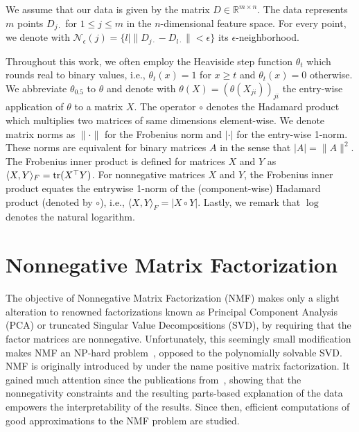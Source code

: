We assume that our data is given by the matrix $D\in\mathbb{R}^{m\times n}$. The data represents $m$ points $D_{j\cdot}$ for $1\leq j\leq m$ in the $n$-dimensional feature space. For every point, we denote with $\mathcal{N}_\epsilon(j)=\{l| \|D_{j\cdot}-D_{l\cdot}\|<\epsilon\}$ its $\epsilon$-neighborhood.

Throughout this work, we often employ the Heaviside step function $\theta_t$ which rounds real to binary values, i.e., $\theta_t(x)=1$ for $x\geq t$  and $\theta_t(x)=0$ otherwise. We abbreviate $\theta_{0.5}$ to $\theta$ and denote with $\theta(X)=(\theta(X_{ji}))_{ji}$ the entry-wise application of $\theta$ to a matrix $X$.
The operator $\circ$ denotes the Hadamard product which multiplies two matrices of same dimensions element-wise. 
We denote matrix norms as $\|\cdot\|$ for the Frobenius norm and $|\cdot|$ for the entry-wise 1-norm. These norms are equivalent for binary matrices $A$ in the sense that $|A|=\|A\|^2$. The Frobenius inner product is defined for matrices $X$ and $Y$ as $\langle X,Y\rangle_F=\operatorname*{tr}(X^\top Y)$. For nonnegative matrices $X$ and $Y$, the Frobenius inner product equates the entrywise 1-norm of the (component-wise) Hadamard product (denoted by $\circ$), i.e., $\langle X,Y\rangle_F=|X\circ Y|$. 
Lastly, we remark that $\log$ denotes the natural logarithm. 
\section{Nonnegative Matrix Factorization}
The objective of Nonnegative Matrix Factorization (NMF) makes only a slight alteration to renowned factorizations known as Principal Component Analysis (PCA) or truncated Singular Value Decompositions (SVD), by requiring that the factor matrices are nonnegative. Unfortunately, this seemingly small modification makes NMF an NP-hard problem~\citep{vavasis2009complexity}, opposed to the polynomially solvable SVD. NMF is originally introduced by \cite{paatero1994positive} under the name positive matrix factorization. It gained much attention since the publications from~\citeauthor{lee1999learning}, showing that the nonnegativity constraints and the resulting parts-based explanation of the data empowers the interpretability of the results. Since then, efficient computations of good approximations to the NMF problem are studied.            

